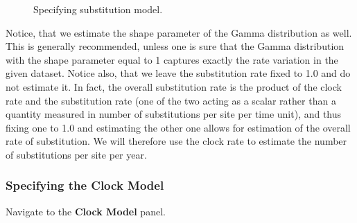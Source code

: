\documentclass[11pt]{article}
\begin{document}
\begin{figure}[h!]
\centering
{}
\caption{\small Specifying substitution model.}
\label{substitutionModel}
\end{figure}

Notice, that we estimate the shape parameter of the Gamma distribution as well. This is generally recommended, unless one is sure that the Gamma distribution with the shape parameter equal to 1 captures exactly the rate variation in the given dataset.
Notice also, that we leave the substitution rate fixed to 1.0 and do not estimate it. In fact, the overall substitution rate is the product of the clock rate and the substitution rate (one of the two acting as a scalar rather than a quantity measured in number of substitutions per site per time unit), and thus fixing one to 1.0 and estimating the other one allows for estimation of the overall rate of substitution. We will therefore use the clock rate to estimate the number of substitutions per site per year. 



\bigskip
\subsubsection{Specifying the Clock Model}

\begin{framed}
Navigate to the \textbf{Clock Model} panel.
\end{framed}
\end{document}
